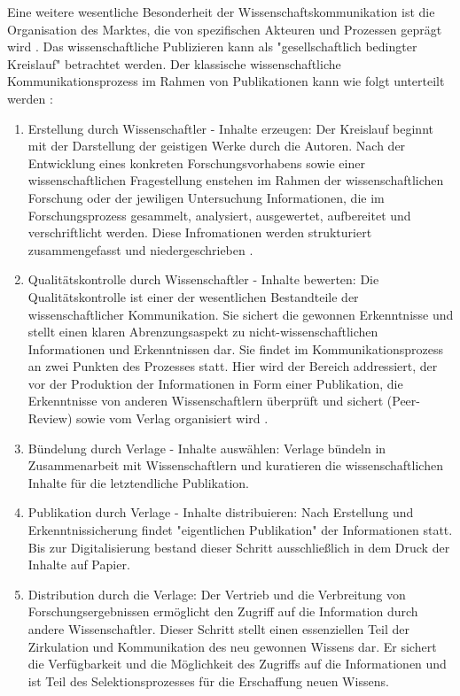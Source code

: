 Eine weitere wesentliche Besonderheit der Wissenschaftskommunikation ist die Organisation des Marktes, die von spezifischen Akteuren und Prozessen geprägt wird \cite{Hess_2006}. Das wissenschaftliche Publizieren kann als "gesellschaftlich bedingter Kreislauf" \cite{schirmbacher_2009_wisspub} betrachtet werden. Der klassische wissenschaftliche Kommunikationsprozess im Rahmen von Publikationen kann wie folgt unterteilt werden \cite{cite:11b} \cite{Hess_2006}:
\begin{enumerate}
\item Erstellung durch Wissenschaftler - Inhalte erzeugen: 
Der Kreislauf beginnt mit der Darstellung der geistigen Werke durch die Autoren\cite{schirmbacher_2009_wisspub}. Nach der Entwicklung eines konkreten Forschungsvorhabens sowie einer wissenschaftlichen Fragestellung enstehen im Rahmen der wissenschaftlichen Forschung oder der jewiligen Untersuchung Informationen\cite{cite:11c}, die im Forschungsprozess gesammelt, analysiert, ausgewertet, aufbereitet und verschriftlicht werden\cite{cite:11d}. Diese Infromationen werden strukturiert zusammengefasst und niedergeschrieben \cite{Hess_2006}.
\item Qualitätskontrolle durch Wissenschaftler - Inhalte bewerten: 
Die Qualitätskontrolle ist einer der wesentlichen Bestandteile der wissenschaftlicher Kommunikation. Sie sichert die gewonnen Erkenntnisse\cite{cite:11e} und stellt einen klaren Abrenzungsaspekt zu nicht-wissenschaftlichen Informationen und Erkenntnissen dar\cite{cite:11f}. Sie findet im Kommunikationsprozess an zwei Punkten des Prozesses statt. Hier wird der Bereich addressiert, der vor der Produktion der Informationen in Form einer Publikation, die Erkenntnisse von anderen Wissenschaftlern überprüft und sichert (Peer-Review) \cite{Hess_2006} sowie vom Verlag organisiert wird \cite{schirmbacher_2009_wisspub}.
\item Bündelung durch Verlage - Inhalte auswählen:
Verlage bündeln in Zusammenarbeit mit Wissenschaftlern und kuratieren die wissenschaftlichen Inhalte für die letztendliche Publikation. 
\item Publikation durch Verlage - Inhalte distribuieren: 
Nach Erstellung und Erkenntnissicherung findet "eigentlichen Publikation" \cite{schirmbacher_2009_wisspub} der Informationen statt. Bis zur Digitalisierung bestand dieser Schritt ausschließlich in dem Druck der Inhalte auf Papier.\cite{cite:11h}
\item Distribution durch die Verlage: 
Der Vertrieb und die Verbreitung von Forschungsergebnissen ermöglicht den Zugriff auf die Information durch andere Wissenschaftler. Dieser Schritt stellt einen essenziellen Teil der Zirkulation und Kommunikation des neu gewonnen Wissens dar\cite{cite:11i}. Er sichert die Verfügbarkeit und die Möglichkeit des Zugriffs auf die Informationen und ist Teil des Selektionsprozesses für die Erschaffung neuen Wissens.\cite{cite:11l}

\end{enumerate}
